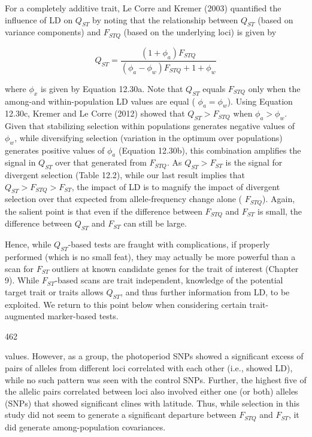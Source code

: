 \documentclass{article}
\begin{document}
For a completely additive trait, Le Corre and Kremer (2003) quantified the influence of LD on  $ Q_{ST} $ by noting that the relationship between  $ Q_{ST} $ (based on variance components) and  $ F_{STQ} $ (based on the underlying loci) is given by

\begin{equation}
Q_{ST}=\frac{(1+\phi_{a})F_{STQ}}{(\phi_{a}-\phi_{w})F_{STQ}+1+\phi_{w}}
\tag{12.30c}
\label{eq:12_30c}
\end{equation}

where  $ \phi_x $ is given by Equation 12.30a. Note that  $ Q_{ST} $ equals  $ F_{STQ} $ only when the among-and within-population LD values are equal ( $ \phi_a = \phi_w $). Using Equation 12.30c, Kremer and Le Corre (2012) showed that  $ Q_{ST} > F_{STQ} $ when  $ \phi_a > \phi_w $. Given that stabilizing selection within populations generates negative values of  $ \phi_w $, while diversifying selection (variation in the optimum over populations) generates positive values of  $ \phi_a $ (Equation 12.30b), this combination amplifies the signal in  $ Q_{ST} $ over that generated from  $ F_{STQ} $. As  $ Q_{ST} > F_{ST} $ is the signal for divergent selection (Table 12.2), while our last result implies that  $ Q_{ST} > F_{STQ} > F_{ST} $, the impact of LD is to magnify the impact of divergent selection over that expected from allele-frequency change alone ( $ F_{STQ} $). Again, the salient point is that even if the difference between  $ F_{STQ} $ and  $ F_{ST} $ is small, the difference between  $ Q_{ST} $ and  $ F_{ST} $ can still be large.

Hence, while  $ Q_{ST} $-based tests are fraught with complications, if properly performed (which is no small feat), they may actually be more powerful than a scan for  $ F_{ST} $ outliers at known candidate genes for the trait of interest (Chapter 9). While  $ F_{ST} $-based scans are trait independent, knowledge of the potential target trait or traits allows  $ Q_{ST} $, and thus further information from LD, to be exploited. We return to this point below when considering certain trait-augmented marker-based tests.

462

values. However, as a group, the photoperiod SNPs showed a significant excess of pairs of alleles from different loci correlated with each other (i.e., showed LD), while no such pattern was seen with the control SNPs. Further, the highest five of the allelic pairs correlated between loci also involved either one (or both) alleles (SNPs) that showed significant clines with latitude. Thus, while selection in this study did not seem to generate a significant departure between  $ F_{STQ} $ and  $ F_{ST} $, it did generate among-population covariances.
\end{document}
